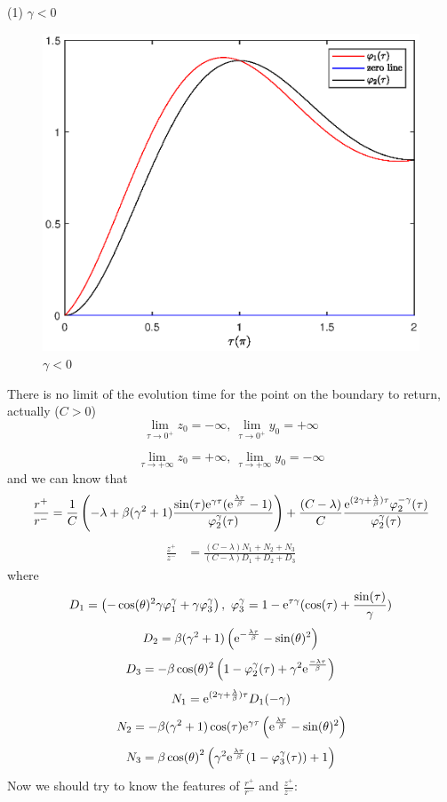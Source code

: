 \documentclass[a4paper,10pt]{article}
\begin{document}
\begin{enumerate}
			(1) $\gamma <0$
			\begin{figure}[h]
				\centering
				\includegraphics[width= 0.6 \textwidth]{BEB_Explanation/figures/gamma_negative.eps}
				\caption{$\gamma < 0$}
				\label{fig:auxilliary function negative gamma}
			\end{figure}
		
		There is no limit of the evolution time for the point on the boundary to return, actually ($C >0 $)
		$$ 
		\lim_{\tau \rightarrow 0^+} z_0 = - \infty,~\lim_{\tau \rightarrow 0^+} y_0 = +\infty
		$$
		
		$$ 
		\lim_{\tau \rightarrow +\infty} z_0 = + \infty,~\lim_{\tau \rightarrow +\infty} y_0 = -\infty
		$$
		and we can know that 
		\begin{equation}
			\frac{r^+}{r^-}=\frac{1}{C} 
		\left(
			-\lambda + \beta (\gamma^2+1)\frac
			{
				\sin(\tau) {\rm e}^{ \gamma\tau} ({\rm e}^{ \frac{\lambda \tau}{\beta}} - 1)
			}
			{
				\varphi_2^{\gamma}(\tau)
			}
		\right)
		+
		\frac{(C-\lambda)}{C} 
		\frac
		{
			{\rm e}^{(2\gamma + \frac{\lambda}{\beta}) \tau} \varphi_2^{-\gamma}(\tau) 
		}
		{
		\varphi_2^{\gamma}(\tau)
		}
			\label{eq:ratio_r for case alpha notequal lambda}
		\end{equation}
		\begin{align}
			\nonumber
			\frac{z^+}{z^-} &= 
			\frac
			{
				(C-\lambda) N_1 + N_2 + N_3
			}
			{
				(C-\lambda) D_1 + D_2 + D_3
			}
			\label{eq:ratio_Z for case alpha notequal lambda}
		\end{align}
	where 
	$$  
	D_1=
	\left(
	-\cos(\theta )^{2} \gamma \varphi_1^{\gamma}
	+ 
	\gamma  \varphi_3^{\gamma}
	\right),~\varphi_3^{\gamma} = 1-{\rm e}^{\tau  \gamma} (\cos(\tau )+\frac{\sin(\tau )}{\gamma})
	$$
	$$
	D_2 = 
	\beta  (\gamma^{2}+1) 
	\left(
	{\rm e}^{-\frac{\lambda  \tau}{\beta}}-\sin(\theta )^{2}
	\right)
	$$
	$$
	D_3=
	-\beta  \cos(\theta )^{2} 
	\left(
	 1-\varphi_2^{\gamma}(\tau )+\gamma^{2} {\rm e}^{\frac{-\lambda  \tau}{\beta}}
	\right)
	$$
	$$
	N_1 = {\rm e}^{(2\gamma + \frac{\lambda}{\beta}) \tau} D_1(-\gamma)
	$$
	$$
	N_2 = -\beta (\gamma^{2}+1) \cos(\tau)  {\rm e}^{\gamma \tau} \left({\rm e}^{\frac{\lambda \tau}{\beta}}-\sin(\theta)^{2}\right)
	$$
	$$
	N_3 = \beta \cos\! \left(\theta\right)^{2} 
	\left(
	\gamma^{2} {\rm e}^{\frac{\lambda \tau}{\beta}} (1- \varphi_3^{\gamma}(\tau))+1
	\right)
	$$
		Now we should try to know the features of $\frac{r^+}{r^-}$ and $\frac{z^+}{z^-}$:
		

\end{enumerate}
\end{document}
